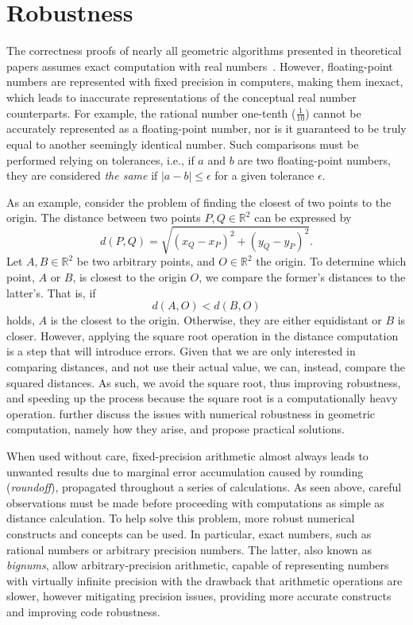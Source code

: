\section{Robustness}%
\label{sec:related.robustness}

The correctness proofs of nearly all geometric algorithms presented in
theoretical papers assumes exact computation with real
numbers~\cite{CGAL:4.13:23LGK}.  However, floating-point numbers are represented
with fixed precision in computers, making them inexact, which leads to
inaccurate representations of the conceptual real number counterparts.  For
example, the rational number one-tenth ($\frac{1}{10}$) cannot be accurately
represented as a floating-point number, nor is it guaranteed to be truly equal
to another seemingly identical number.  Such comparisons must be performed
relying on tolerances, i.e., if $a$ and $b$ are two floating-point numbers, they
are considered \textit{the same} if $|a - b| \le \epsilon$ for a given tolerance
$\epsilon$.

As an example, consider the problem of finding the closest of two points
to the origin.  The distance between two points $P,Q \in \mathbb{R}^2$ can be
expressed by
%
\begin{equation}\label{eq:distance.2}
  d\left(P, Q\right) =
  \sqrt{\left(x_Q - x_P\right)^2 + \left(y_Q - y_P\right)^2}.
\end{equation}%
%
Let $A,B \in \mathbb{R}^2$ be two arbitrary points, and $O \in \mathbb{R}^2$ the
origin.  To determine which point, $A$ or $B$, is closest to the origin $O$, we
compare the former's distances to the latter's.  That is, if
%
\[ 
  d\left(A, O\right) < d\left(B, O\right) 
\]
%
holds, $A$ is the closest to the origin.  Otherwise, they are either equidistant
or $B$ is closer.  However, applying the square root operation in the distance
computation is a step that will introduce errors.  Given that we are only
interested in comparing distances, and not use their actual value, we can,
instead, compare the squared distances.  As such, we avoid the square root, thus
improving robustness, and speeding up the process because the square root is a
computationally heavy operation.   further discuss the
issues with numerical robustness in geometric computation, namely how they
arise, and propose practical solutions.

When used without care, fixed-precision arithmetic almost always leads to
unwanted results due to marginal error accumulation caused by rounding
(\textit{roundoff}), propagated throughout a series of calculations.  As seen
above, careful observations must be made before proceeding with computations as
simple as distance calculation.  To help solve this problem, more robust
numerical constructs and concepts can be used.  In particular, exact numbers,
such as rational numbers or arbitrary precision numbers. The latter, also known
as \textit{bignums}, allow arbitrary-precision arithmetic, capable of
representing numbers with virtually infinite precision with the drawback that
arithmetic operations are slower, however mitigating precision issues, providing
more accurate constructs and improving code robustness.


